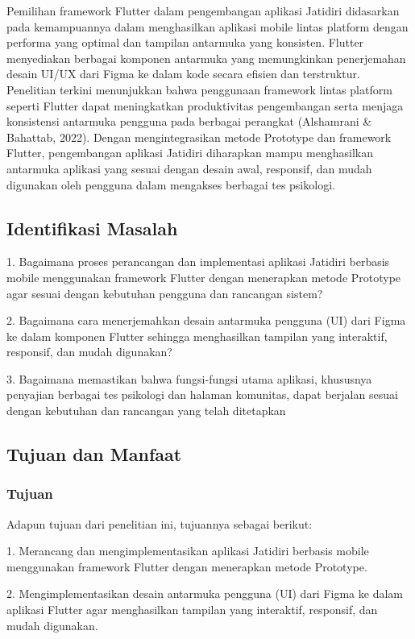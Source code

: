 Pemilihan framework Flutter dalam pengembangan aplikasi Jatidiri didasarkan pada kemampuannya dalam menghasilkan aplikasi mobile lintas platform dengan performa yang optimal dan tampilan antarmuka yang konsisten. Flutter menyediakan berbagai komponen antarmuka yang memungkinkan penerjemahan desain UI/UX dari Figma ke dalam kode secara efisien dan terstruktur. Penelitian terkini menunjukkan bahwa penggunaan framework lintas platform seperti Flutter dapat meningkatkan produktivitas pengembangan serta menjaga konsistensi antarmuka pengguna pada berbagai perangkat (Alshamrani \& Bahattab, 2022). Dengan mengintegrasikan metode Prototype dan framework Flutter, pengembangan aplikasi Jatidiri diharapkan mampu menghasilkan antarmuka aplikasi yang sesuai dengan desain awal, responsif, dan mudah digunakan oleh pengguna dalam mengakses berbagai tes psikologi.

\subsection{Identifikasi Masalah}

1. Bagaimana proses perancangan dan implementasi aplikasi Jatidiri berbasis mobile menggunakan framework Flutter dengan menerapkan metode Prototype agar sesuai dengan kebutuhan pengguna dan rancangan sistem?

2. Bagaimana cara menerjemahkan desain antarmuka pengguna (UI) dari Figma ke dalam komponen Flutter sehingga menghasilkan tampilan yang interaktif, responsif, dan mudah digunakan?

3. Bagaimana memastikan bahwa fungsi-fungsi utama aplikasi, khususnya penyajian berbagai tes psikologi dan halaman komunitas, dapat berjalan sesuai dengan kebutuhan dan rancangan yang telah ditetapkan

\subsection{Tujuan dan Manfaat}

\subsubsection{Tujuan}

Adapun tujuan dari penelitian ini, tujuannya sebagai berikut:

1. Merancang dan mengimplementasikan aplikasi Jatidiri berbasis mobile menggunakan framework Flutter dengan menerapkan metode Prototype.

2. Mengimplementasikan desain antarmuka pengguna (UI) dari Figma ke dalam aplikasi Flutter agar menghasilkan tampilan yang interaktif, responsif, dan mudah digunakan.

